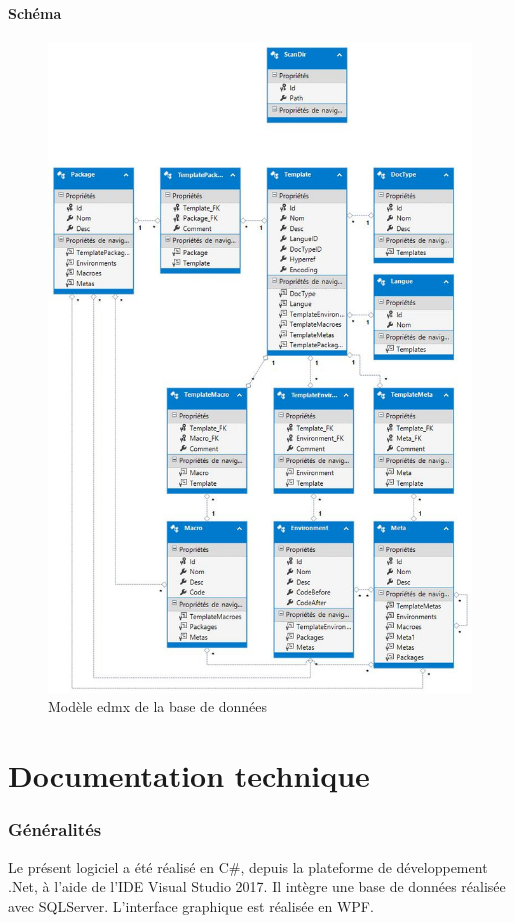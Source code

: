 \documentclass[a4paper, oneside]{article}
\begin{document}
\subsection{Schéma}
\label{sec:orgfc4529f}
\begin{figure}[htbp]
\centering
\includegraphics[width=.9\linewidth]{../Images/EntityDesignerDiagram.jpg}
\caption{\label{fig:org2dbedff}
Modèle edmx de la base de données}
\end{figure}

\pagebreak
\setcounter{section}{0}
\part{Documentation technique}


\section{Généralités}
\label{sec:orgd957e06}
Le présent logiciel a été réalisé en C\#, depuis la plateforme de développement
.Net, à l'aide de l'IDE Visual Studio 2017. Il intègre une base de
données réalisée avec SQLServer. L'interface graphique est réalisée en
WPF.
\end{document}
